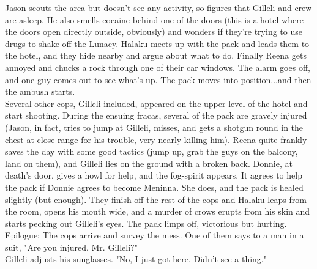 \documentclass[oneside,12pt]{book}
\begin{document}
\begin{flushleft}
Jason scouts the area but doesn't see any activity, so figures that Gilleli and crew are asleep. He also smells cocaine behind one of the doors (this is a hotel where the doors open directly outside, obviously) and wonders if they're trying to use drugs to shake off the Lunacy. Halaku meets up with the pack and leads them to the hotel, and they hide nearby and argue about what to do. Finally Reena gets annoyed and chucks a rock through one of their car windows. The alarm goes off, and one guy comes out to see what's up. The pack moves into position...and then the ambush starts.\\



Several other cops, Gilleli included, appeared on the upper level of the hotel and start shooting. During the ensuing fracas, several of the pack are gravely injured (Jason, in fact, tries to jump at Gilleli, misses, and gets a shotgun round in the chest at close range for his trouble, very nearly killing him). Reena quite frankly saves the day with some good tactics (jump up, grab the guys on the balcony, land on them), and Gilleli lies on the ground with a broken back. Donnie, at death's door, gives a howl for help, and the fog-spirit appears. It agrees to help the pack if Donnie agrees to become Meninna. She does, and the pack is healed slightly (but enough). They finish off the rest of the cops and Halaku leaps from the room, opens his mouth wide, and a murder of crows erupts from his skin and starts pecking out Gilleli's eyes. The pack limps off, victorious but hurting.\\


Epilogue: The cops arrive and survey the mess. One of them says to a man in a suit, "Are you injured, Mr. Gilleli?"\\

Gilleli adjusts his sunglasses. "No, I just got here. Didn't see a thing."\\ 


\end{flushleft}
\end{document}
